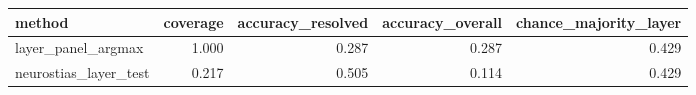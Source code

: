 \begin{tabular}{lrrrr}
\toprule
method & coverage & accuracy_resolved & accuracy_overall & chance_majority_layer \\
\midrule
layer_panel_argmax & 1.000 & 0.287 & 0.287 & 0.429 \\
neurostias_layer_test & 0.217 & 0.505 & 0.114 & 0.429 \\
\bottomrule
\end{tabular}
